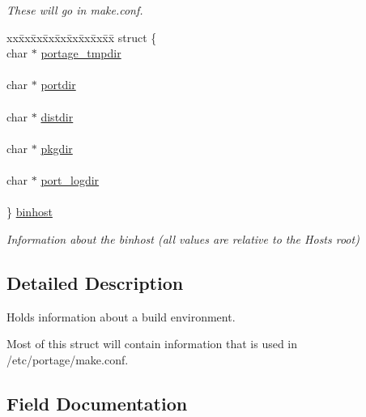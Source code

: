 \begin{DoxyCompactItemize}
\begin{tabbing}
\end{tabbing}\begin{DoxyCompactList}\small\item\em These will go in make.\+conf. \end{DoxyCompactList}\item 
\begin{tabbing}
xx\=xx\=xx\=xx\=xx\=xx\=xx\=xx\=xx\=\kill
struct \{\\
\>char $\ast$ \mbox{\hyperlink{struct_____host_a40e40d3bc778b8f73c312edd7c4c36a8}{portage\_tmpdir}}\\
\>\\
\>char $\ast$ \mbox{\hyperlink{struct_____host_ac4e7738b691197122d5f18069425933a}{portdir}}\\
\>\\
\>char $\ast$ \mbox{\hyperlink{struct_____host_ad108845535e7ae4801e939319b208e52}{distdir}}\\
\>\\
\>char $\ast$ \mbox{\hyperlink{struct_____host_af2be365c35b8cd256780212154c5e639}{pkgdir}}\\
\>\\
\>char $\ast$ \mbox{\hyperlink{struct_____host_a8d9d6cea205f5bdb44284aafb41b9266}{port\_logdir}}\\
\>\\
\} \mbox{\hyperlink{struct_____host_adde139e84a9a3722fee6faab0978568f}{binhost}}\\

\end{tabbing}\begin{DoxyCompactList}\small\item\em Information about the binhost (all values are relative to the Host\textquotesingle{}s root) \end{DoxyCompactList}\end{DoxyCompactItemize}


\subsection{Detailed Description}
Holds information about a build environment. 

Most of this struct will contain information that is used in /etc/portage/make.conf. 

\subsection{Field Documentation}
\mbox{\label{struct_____host_a781364a501280f6632f702fc1dceb8e4}} 
